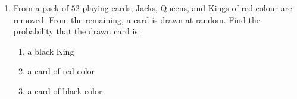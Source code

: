 \documentclass{article}
\begin{document}
\begin{enumerate}
\item From a pack of $52$ playing cards, Jacks, Queens, and Kings of red colour are removed. From the remaining, a card is drawn at random. Find the probability that the drawn card is:
     \begin{enumerate}                                                                                                                                          \item a black King
             \item a card of red color
	               \item a card of black color
		             \end{enumerate}
\end{enumerate}
  
\end{document}
